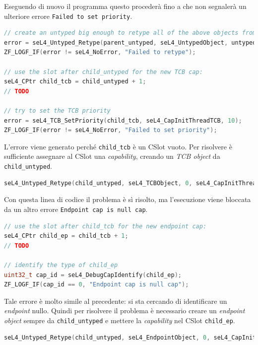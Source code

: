 Eseguendo di nuovo il programma questo procederà fino a che non segnalerà un ulteriore errore \texttt{Failed to set priority}.
\begin{lstlisting}[language=C++]
// create an untyped big enough to retype all of the above objects from
error = seL4_Untyped_Retype(parent_untyped, seL4_UntypedObject, untyped_size_bits, seL4_CapInitThreadCNode, 0, 0, child_untyped, 1);
ZF_LOGF_IF(error != seL4_NoError, "Failed to retype");

// use the slot after child_untyped for the new TCB cap:
seL4_CPtr child_tcb = child_untyped + 1;
// TODO

// try to set the TCB priority
error = seL4_TCB_SetPriority(child_tcb, seL4_CapInitThreadTCB, 10);
ZF_LOGF_IF(error != seL4_NoError, "Failed to set priority");
\end{lstlisting}

L'errore viene generato perché \texttt{child\_tcb} è un CSlot vuoto. Per risolvere è sufficiente assegnare al CSlot una \textit{capability}, creando un \textit{TCB object} da \texttt{child\_untyped}.
\begin{lstlisting}[language=C++]
seL4_Untyped_Retype(child_untyped, seL4_TCBObject, 0, seL4_CapInitThreadCNode, 0, 0, child_tcb, 1);
\end{lstlisting}

Con questa linea di codice il problema è sì risolto, ma l'esecuzione viene bloccata da un altro errore \texttt{Endpoint cap is null cap}.
\begin{lstlisting}[language=C++]
// use the slot after child_tcb for the new endpoint cap:
seL4_CPtr child_ep = child_tcb + 1;
// TODO

// identify the type of child_ep
uint32_t cap_id = seL4_DebugCapIdentify(child_ep);
ZF_LOGF_IF(cap_id == 0, "Endpoint cap is null cap");
\end{lstlisting}

Tale errore è molto simile al precedente: si sta cercando di identificare un \textit{endpoint} nullo. Quindi per risolvere il problema è necessario creare un \textit{endpoint object} sempre da \texttt{child\_untyped} e mettere la \textit{capability} nel CSlot \texttt{child\_ep}.
\begin{lstlisting}[language=C++]
seL4_Untyped_Retype(child_untyped, seL4_EndpointObject, 0, seL4_CapInitThreadCNode, 0, 0, child_ep, 1);
\end{lstlisting}

